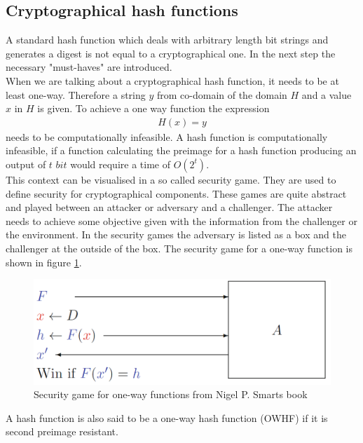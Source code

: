 \documentclass[a4paper,11pt, twoside]{article}
\begin{document}
\subsection{Cryptographical hash functions}
A standard hash function which deals with arbitrary length bit strings and generates a digest is not equal to a cryptographical one. In the next step the necessary "must-haves" are introduced. \newline\\[0.1cm]
When we are talking about a cryptographical hash function, it needs to be at least one-way. Therefore a string $y$ from co-domain of the domain $H$ and a value $x$ in $H$ is given. To achieve a one way function the expression
\begin{align*}
    H(x)=y
\end{align*}
needs to be computationally infeasible. A hash function is computationally infeasible, if a function calculating the preimage for a hash function producing an output of $t$ $bit$ would require a time of $O(2^t)$.\newline\\[0.1cm]
This context can be visualised in a so called security game. They are used to define security for cryptographical components. These games are quite abstract and played between an attacker or adversary and a challenger. The attacker needs to achieve some objective given with the information from the challenger or the environment. In the security games the adversary is listed as a box and the challenger at the outside of the box. The security game for a one-way function is shown in figure \ref{fig:secgame_onewayfunc}.
\begin{figure}[H]
	\centering
	\includegraphics[scale=0.34]{figures/SecGame_OneWayFunc.png}
	\caption{Security game for one-way functions from Nigel P. Smarts book}
	\label{fig:secgame_onewayfunc}
\end{figure}
A hash function is also said to be a one-way hash function (OWHF) if it is second preimage resistant.\cite{Preneel2005}\newline\\[0.1cm]
\end{document}
